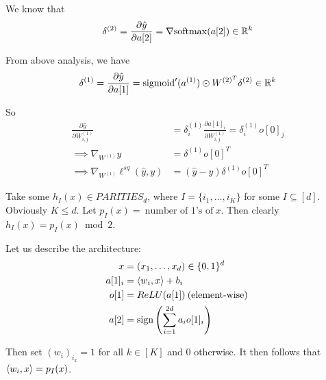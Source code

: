 \documentclass[a4paper, 10pt]{article}
\begin{document}
We know that \begin{equation*}
\delta^{(2)} = \frac{\partial \hat{y}}{\partial a[2]} = \nabla \mathrm{softmax}(a[2]) \in \mathbb{R}^k
\end{equation*}

From above analysis, we have \begin{equation*}
\delta^{(1)} = \frac{\partial \hat{y}}{\partial a[1]} = \mathrm{sigmoid}'(a^{(1)}) \odot W^{(2)^T} \delta^{(2)} \in \mathbb{R}^k
\end{equation*}

So
\begin{align*}
    \frac{\partial \hat{y}}{\partial W^{(1)}_{i, j}} &= \delta^{(1)}_i \frac{\partial a[1]_i}{\partial W^{(1)}_{i, j}} = \delta^{(1)}_i o[0]_j \\
    \implies \nabla_{W^{(1)} } \hat{y} &= \delta^{(1)} o[0]^T \\
    \implies \nabla_{W^{(1)}} \ell^{sq}(\hat{y}, y) &= (\hat{y} - y)  \delta^{(1)} o[0]^T
\end{align*}



\begin{problem} 

    Take some $h_I(x) \in PARITIES_d$, where $I = \{i_1, \ldots, i_K\}$ for some $I \subseteq [d]$. Obviously $K \leq d$. Let $p_I(x) = \:\text{number of 1's of}\: x$. Then clearly $h_I(x) = p_I(x) \bmod 2$.

    Let us describe the architecture: 
    \begin{align*}
        x &= (x_1, \ldots, x_d) \in \{0, 1\}^d \\
        a[1]_i &= \langle w_i, x \rangle + b_i \\
        o[1] &= ReLU(a[1]) \:\text{(element-wise)}\: \\
        a[2] &= \mathrm{sign}\left(\sum_{i=1}^{2d} a_i o[1]_i\right)
    \end{align*}

    
    Then set $(w_i)_{i_k} = 1$ for all $k \in [K]$ and $0$ otherwise. It then follows that $\langle w_i, x \rangle = p_I(x)$. 
\end{problem}
\end{document}
